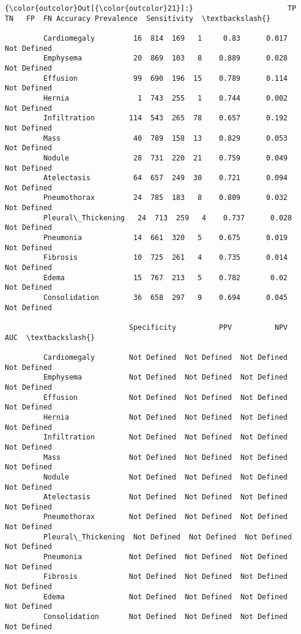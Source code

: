 \documentclass[11pt]{article}
\begin{document}
\begin{Verbatim}[commandchars=\\\{\}]
{\color{outcolor}Out[{\color{outcolor}21}]:}                      TP   TN   FP  FN Accuracy Prevalence  Sensitivity  \textbackslash{}
                                                                                  
         Cardiomegaly         16  814  169   1     0.83      0.017  Not Defined   
         Emphysema            20  869  103   8    0.889      0.028  Not Defined   
         Effusion             99  690  196  15    0.789      0.114  Not Defined   
         Hernia                1  743  255   1    0.744      0.002  Not Defined   
         Infiltration        114  543  265  78    0.657      0.192  Not Defined   
         Mass                 40  789  158  13    0.829      0.053  Not Defined   
         Nodule               28  731  220  21    0.759      0.049  Not Defined   
         Atelectasis          64  657  249  30    0.721      0.094  Not Defined   
         Pneumothorax         24  785  183   8    0.809      0.032  Not Defined   
         Pleural\_Thickening   24  713  259   4    0.737      0.028  Not Defined   
         Pneumonia            14  661  320   5    0.675      0.019  Not Defined   
         Fibrosis             10  725  261   4    0.735      0.014  Not Defined   
         Edema                15  767  213   5    0.782       0.02  Not Defined   
         Consolidation        36  658  297   9    0.694      0.045  Not Defined   
         
                             Specificity          PPV          NPV          AUC  \textbackslash{}
                                                                                  
         Cardiomegaly        Not Defined  Not Defined  Not Defined  Not Defined   
         Emphysema           Not Defined  Not Defined  Not Defined  Not Defined   
         Effusion            Not Defined  Not Defined  Not Defined  Not Defined   
         Hernia              Not Defined  Not Defined  Not Defined  Not Defined   
         Infiltration        Not Defined  Not Defined  Not Defined  Not Defined   
         Mass                Not Defined  Not Defined  Not Defined  Not Defined   
         Nodule              Not Defined  Not Defined  Not Defined  Not Defined   
         Atelectasis         Not Defined  Not Defined  Not Defined  Not Defined   
         Pneumothorax        Not Defined  Not Defined  Not Defined  Not Defined   
         Pleural\_Thickening  Not Defined  Not Defined  Not Defined  Not Defined   
         Pneumonia           Not Defined  Not Defined  Not Defined  Not Defined   
         Fibrosis            Not Defined  Not Defined  Not Defined  Not Defined   
         Edema               Not Defined  Not Defined  Not Defined  Not Defined   
         Consolidation       Not Defined  Not Defined  Not Defined  Not Defined   
         

\end{Verbatim}
\end{document}
